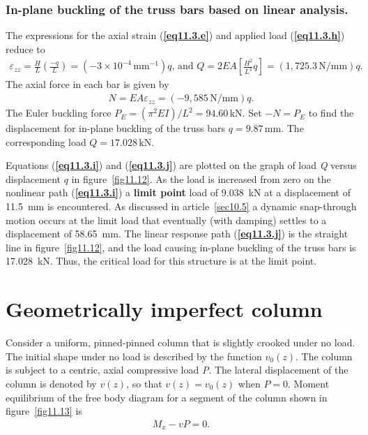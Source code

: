 \documentclass{AeroStructure-ERJohnson}
\begin{document}
\begin{example}
\vspace*{-1pc}

\subsubsection{In-plane buckling of the truss bars based on linear analysis.} The expressions for the axial strain (\textbf{\ref{eq11.3.e}}) and applied load (\textbf{\ref{eq11.3.h}}) reduce to
\begin{align}
\varepsilon_{z z}=\frac{H}{L}\left(\frac{-q}{L}\right)=(-3 \times 10^{-4}\,\mathrm{mm}^{-1}) q,\,\textrm{and } Q=2 E A\left[\frac{H^{2}}{L^{3}} q\right]=(1{,}725.3\,\mathrm{N}/\mathrm{mm}) q. \label{eq11.3.j}\tag{j}
\end{align}
The axial force in each bar is given by
\begin{align}
N=E A \varepsilon_{z z}=(-9{,}585\,\mathrm{N}/\mathrm{mm}) q. \label{eq11.3.k}\tag{k}
\end{align}
The Euler buckling force $P_{E}=\left(\pi^{2} E I\right)/L^{2}=94.60\,\textrm{kN}$. Set $-N=P_{E}$ to find the displacement for in-plane buckling of the truss bars $q=9.87\,\mathrm{mm}$. The corresponding load $Q=17.028\,\textrm{kN}$.

Equations (\textbf{\ref{eq11.3.i}}) and (\textbf{\ref{eq11.3.j}}) are plotted on the graph of load \textit{Q} versus displacement $q$ in figure~\ref{fig11.12}. As the load is increased from zero on the nonlinear path (\textbf{\ref{eq11.3.i}}) a \textbf{limit point} load of 9.038~kN at a displacement of 11.5~mm is encountered. As discussed in article~\ref{sec10.5} a dynamic snap-through motion occurs at the limit load that eventually (with damping) settles to a displacement of 58.65~mm. The linear response path (\textbf{\ref{eq11.3.j}}) is the straight line in figure~\ref{fig11.12}, and the load causing in-plane buckling of the truss bars is 17.028~kN. Thus, the critical load for this structure is at the limit point.
\end{example}

\section{Geometrically imperfect column}\label{sec11.4}

Consider a uniform, pinned-pinned column that is slightly crooked under no load. The initial shape under no load is described by the function $v_{0}(z)$. The column is subject to a centric, axial compressive load \textit{P}. The lateral displacement of the column is denoted by $v(z)$, so that $v(z)=v_{0}(z)$ when $P=0$. Moment equilibrium of the\vadjust{\vspace*{8pt}\pagebreak} free body diagram for a segment of the column shown in figure~\ref{fig11.13} is
\begin{align}\label{eq11.77}
M_{x}-v P=0.
\end{align}
\end{document}
